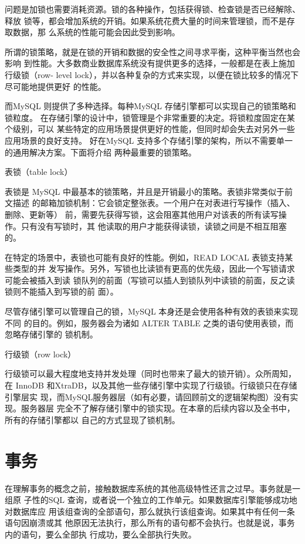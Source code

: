 问题是加锁也需要消耗资源。锁的各种操作，包括获得锁、检查锁是否已经解除、释放
锁等，都会增加系统的开销。如果系统花费大量的时间来管理锁，而不是存取数据，那
么系统的性能可能会因此受到影响。

所谓的锁策略，就是在锁的开销和数据的安全性之间寻求平衡，这种平衡当然也会影响
到性能。大多数商业数据库系统没有提供更多的选择，一般都是在表上施加行级锁（row-
level lock），并以各种复杂的方式来实现，以便在锁比较多的情况下尽可能地提供更好
的性能。

而MySQL 则提供了多种选择。每种MySQL 存储引擎都可以实现自己的锁策略和锁粒度。
在存储引擎的设计中，锁管理是个非常重要的决定。将锁粒度固定在某个级别，可以
某些特定的应用场景提供更好的性能，但同时却会失去对另外一些应用场景的良好支持。
好在MySQL 支持多个存储引擎的架构，所以不需要单一的通用解决方案。下面将介绍
两种最重要的锁策略。

表锁（table lock）

表锁是 MySQL 中最基本的锁策略，并且是开销最小的策略。表锁非常类似于前文描述
的邮箱加锁机制：它会锁定整张表。一个用户在对表进行写操作（插入、删除、更新等）
前，需要先获得写锁，这会阻塞其他用户对该表的所有读写操作。只有没有写锁时，其
他读取的用户才能获得读锁，读锁之间是不相互阻塞的。

在特定的场景中，表锁也可能有良好的性能。例如，READ LOCAL 表锁支持某些类型的并
发写操作。另外，写锁也比读锁有更高的优先级，因此一个写锁请求可能会被插入到读
锁队列的前面（写锁可以插人到锁队列中读锁的前面，反之读锁则不能插入到写锁的前
面）。

尽管存储引擎可以管理自己的锁，MySQL 本身还是会使用各种有效的表锁来实现不同
的目的。例如，服务器会为诸如 ALTER TABLE 之类的语句使用表锁，而忽略存储引擎的
锁机制。

行级锁（row lock）

行级锁可以最大程度地支持并发处理（同时也带来了最大的锁开销）。众所周知，在
InnoDB 和XtraDB，以及其他一些存储引擎中实现了行级锁。行级锁只在存储引擎层实
现，而MySQL服务器层（如有必要，请回顾前文的逻辑架构图）没有实现。服务器层
完全不了解存储引擎中的锁实现。在本章的后续内容以及全书中，所有的存储引擎都以
自己的方式显现了锁机制。

\section{事务}
在理解事务的概念之前，接触数据库系统的其他高级特性还言之过早。事务就是一组原
子性的SQL 查询，或者说一个独立的工作单元。如果数据库引擎能够成功地对数据库应
用该组查询的全部语句，那么就执行该组查询。如果其中有任何一条语句因崩溃或其
他原因无法执行，那么所有的语句都不会执行。也就是说，事务内的语句，要么全部执
行成功，要么全部执行失败。

